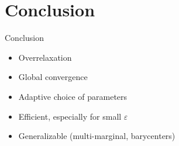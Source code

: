 \documentclass[compress]{beamer}
\renewcommand{\epsilon}{\varepsilon}
\begin{document}
\section*{Conclusion}
\begin{frame}{Conclusion}
	\begin{itemize}
		\item Overrelaxation
		\item Global convergence
		\item Adaptive choice of parameters
		\item Efficient, especially for small $\epsilon$
		\item Generalizable (multi-marginal, barycenters)
	\end{itemize}
\end{frame}
\end{document}
